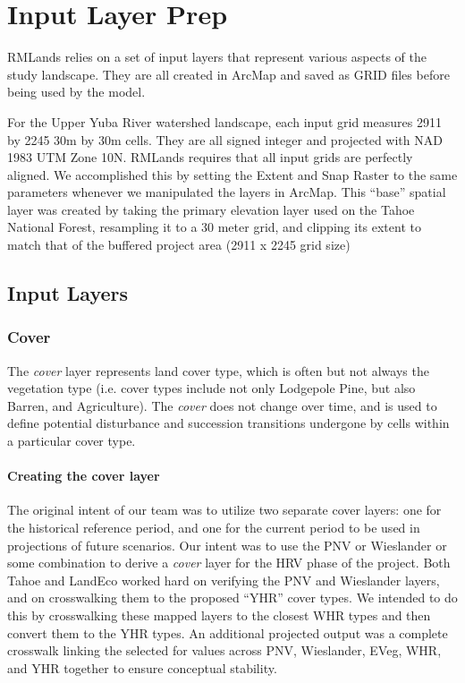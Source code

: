 \chapter{Input Layer Prep}
RMLands relies on a set of input layers that represent various aspects of the study landscape. They are all created in ArcMap and saved as GRID files before being used by the model. 

For the Upper Yuba River watershed landscape, each input grid measures 2911 by 2245 30m by 30m cells. They are all signed integer and projected with NAD 1983 UTM Zone 10N. RMLands requires that all input grids are perfectly aligned. We accomplished this by setting the Extent and Snap Raster to the same parameters whenever we manipulated the layers in ArcMap. This ``base'' spatial layer was created by taking the primary elevation layer used on the Tahoe National Forest, resampling it to a 30 meter grid, and clipping its extent to match that of the buffered project area (2911 x 2245 grid size)

\section{Input Layers}
\subsection{Cover}
The \emph{cover} layer represents land cover type, which is often but not always the vegetation type (i.e. cover types include not only Lodgepole Pine, but also Barren, and Agriculture). The \emph{cover} does not change over time, and is used to define potential disturbance and succession transitions undergone by cells within a particular cover type.

\subsubsection{Creating the cover layer}
The original intent of our team was to utilize two separate cover layers: one for the historical reference period, and one for the current period to be used in projections of future scenarios. Our intent was to use the PNV or Wieslander or some combination to derive a \emph{cover} layer for the HRV phase of the project. Both Tahoe and LandEco worked hard on verifying the PNV and Wieslander layers, and on crosswalking them to the proposed ``YHR'' cover types. We intended to do this by crosswalking these mapped layers to the closest WHR types and then convert them to the YHR types. An additional projected output was a complete crosswalk linking the selected for values across PNV, Wieslander, EVeg, WHR, and YHR together to ensure conceptual stability.

